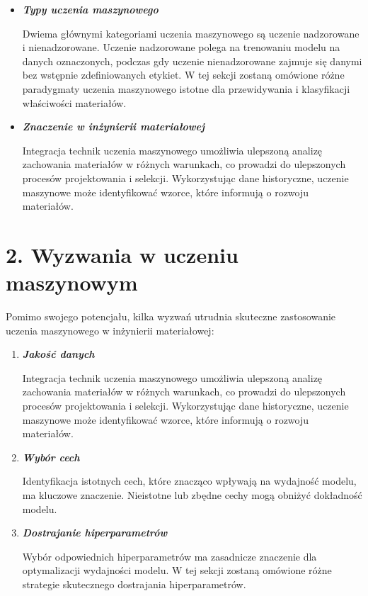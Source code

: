 \begin{itemize}

\item {\textbf{\textit{Typy uczenia maszynowego}}}

Dwiema głównymi kategoriami uczenia maszynowego są uczenie nadzorowane i nienadzorowane.
Uczenie nadzorowane polega na trenowaniu modelu na danych oznaczonych, podczas gdy uczenie nienadzorowane zajmuje się danymi bez wstępnie zdefiniowanych etykiet.
W tej sekcji zostaną omówione różne paradygmaty uczenia maszynowego istotne dla przewidywania i klasyfikacji właściwości materiałów.




\item {\textbf{\textit{Znaczenie w inżynierii materiałowej}}

Integracja technik uczenia maszynowego umożliwia ulepszoną analizę zachowania materiałów w różnych warunkach, co prowadzi do ulepszonych procesów projektowania i selekcji.
Wykorzystując dane historyczne, uczenie maszynowe może identyfikować wzorce, które informują o rozwoju materiałów.
}



\end{itemize}


{}
\section*{2. Wyzwania w uczeniu maszynowym}
\vspace{-1.0em}
\label{sec:margins}

Pomimo swojego potencjału, kilka wyzwań utrudnia skuteczne zastosowanie uczenia maszynowego w inżynierii materiałowej:
\begin{enumerate}

\item {\textbf{\textit{Jakość danych}}}


Integracja technik uczenia maszynowego umożliwia ulepszoną analizę zachowania materiałów w różnych warunkach, co prowadzi do ulepszonych procesów projektowania i selekcji.
Wykorzystując dane historyczne, uczenie maszynowe może identyfikować wzorce, które informują o rozwoju materiałów.

\item {\textbf{\textit{Wybór cech}}}


Identyfikacja istotnych cech, które znacząco wpływają na wydajność modelu, ma kluczowe znaczenie.
Nieistotne lub zbędne cechy mogą obniżyć dokładność modelu.

\item {\textbf{\textit{Dostrajanie hiperparametrów}}}


Wybór odpowiednich hiperparametrów ma zasadnicze znaczenie dla optymalizacji wydajności modelu.
W tej sekcji zostaną omówione różne strategie skutecznego dostrajania hiperparametrów.
\end{enumerate}

